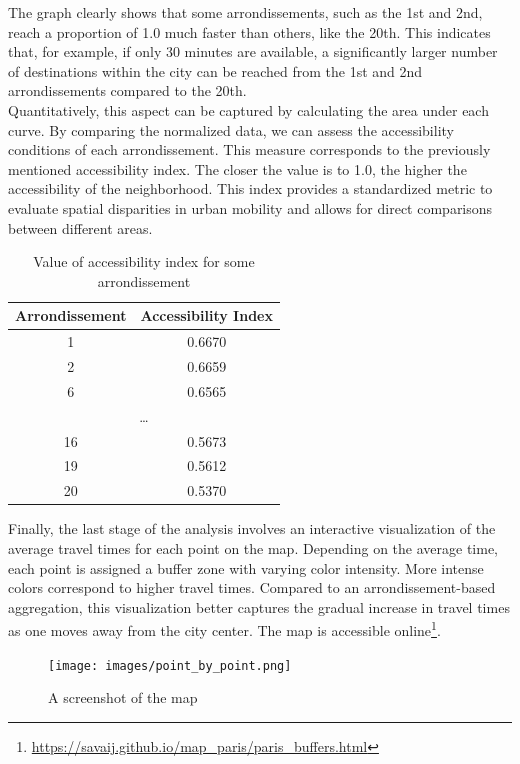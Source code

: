 \documentclass[a4paper,12pt]{article}
\begin{document}
The graph clearly shows that some arrondissements, such as the 1st and 2nd, reach a proportion of 1.0 much faster than others, like the 20th. This indicates that, for example, if only 30 minutes are available, a significantly larger number of destinations within the city can be reached from the 1st and 2nd arrondissements compared to the 20th. \\

Quantitatively, this aspect can be captured by calculating the area under each curve. By comparing the normalized data, we can assess the accessibility conditions of each arrondissement. This measure corresponds to the previously mentioned accessibility index. The closer the value is to 1.0, the higher the accessibility of the neighborhood. This index provides a standardized metric to evaluate spatial disparities in urban mobility and allows for direct comparisons between different areas. \\

\begin{table}[h!]
	\centering
	\begin{tabular}{|c|c|}
		\hline
		\textbf{Arrondissement} & \textbf{Accessibility Index} \\
		\hline
		1  & 0.6670 \\
		2  & 0.6659 \\
		6  & 0.6565 \\
		\hline
		\multicolumn{2}{|c|}{\dots} \\
		\hline
		16 & 0.5673 \\
		19 & 0.5612 \\
		20 & 0.5370 \\
		\hline
	\end{tabular}
	\caption{Value of accessibility index for some arrondissement}
	\label{tab:arrondissement}
\end{table}

Finally, the last stage of the analysis involves an interactive visualization of the average travel times for each point on the map. Depending on the average time, each point is assigned a buffer zone with varying color intensity. More intense colors correspond to higher travel times. Compared to an arrondissement-based aggregation, this visualization better captures the gradual increase in travel times as one moves away from the city center. The map is accessible online\footnote{\url{https://savaij.github.io/map_paris/paris_buffers.html}}.

\begin{figure}[h!]
	\centering
	\texttt{[image: images/point\_by\_point.png]}
	\caption{A screenshot of the map}
	\label{fig:point_by_point}
\end{figure}
\end{document}
